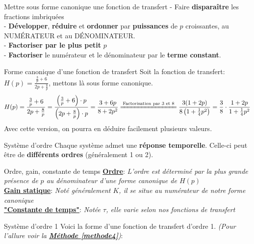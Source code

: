 \documentclass{article}
\begin{document}
{\begin{méthode}{Mettre sous forme canonique une fonction de transfert}
- Faire \textbf{disparaître} les fractions imbriquées\\
- \textbf{Développer}, \textbf{réduire} et \textbf{ordonner} par \textbf{puissances} de $p$ croissantes, au NUMÉRATEUR et au DÉNOMINATEUR.\\
- \textbf{Factoriser par le plus petit} $p$\\
- \textbf{Factoriser} le numérateur et le dénominateur par le \textbf{terme constant}.
\end{méthode}
\begin{exemple}{Forme canonique d'une fonction de transfert}
Soit la fonction de transfert: $H(p) = \frac{\frac{3}{p} + 6}{2p + \frac{8}{p}}$, mettons là sous forme canonique.
\begin{align*} H(p) = \frac{\frac{3}{p} + 6}{2p + \frac{8}{p}} = \frac{\left(\frac{3}{p} + 6\right) \cdot p}{\left(2p + \frac{8}{p}\right) \cdot p} = \frac{3 + 6p}{8 + 2p^2} \xeq{\text{Factorisation par 3 et 8}} \frac{3(1 + 2p)}{8\left(1 + \frac{1}{4}p^2\right)} = \frac{3}{8} \cdot \frac{1 + 2p}{1 + \frac{1}{4}p^2}
\end{align*}
Avec cette version, on pourra en déduire facilement plusieurs valeurs.
\end{exemple}
{}
\begin{definition}{Système d'ordre}
Chaque système admet une \textbf{réponse temporelle}. Celle-ci peut être de \textbf{différents ordres} (généralement 1 ou 2).
\end{definition}
\begin{vocabulaire}{Ordre, gain, constante de temps}
\underline{\textbf{Ordre}}: \textsl{L'ordre est déterminé par la plus grande présence de $p$ au dénominateur d'une forme canonique de $H(p)$}\vspace*{8pt}\\
\underline{\textbf{Gain statique}}: \textsl{Noté généralement $K$, il se situe au numérateur de notre forme canonique}\vspace*{8pt}\\
\underline{\textbf{"Constante de temps"}}: \textsl{Notée $\tau$, elle varie selon nos fonctions de transfert}
\end{vocabulaire}
\begin{definition}{Système d'ordre 1}
Voici la forme d'une fonction de transfert d'ordre 1. \textit{(Pour l'allure voir la \hyperref[methode4]{\textcolor{myorange}{\textbf{Méthode \ref*{methode4}}}})}:
\begin{center}

\end{center}
\end{definition}}
\end{document}
